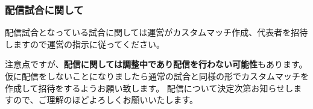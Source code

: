 \documentclass[uplatex,dvipdfmx]{jsarticle}
\begin{document}
	    \subsubsection{配信試合に関して}
            配信試合となっている試合に関しては運営がカスタムマッチ作成、代表者を招待しますので運営の指示に従ってください。
            
            注意点ですが、{\bf 配信に関しては調整中であり配信を行わない可能性}もあります。
            仮に配信をしないことになりましたら通常の試合と同様の形でカスタムマッチを作成して招待をするようお願い致します。
            配信について決定次第お知らせしますので、ご理解のほどよろしくお願いいたします。
\end{document}
